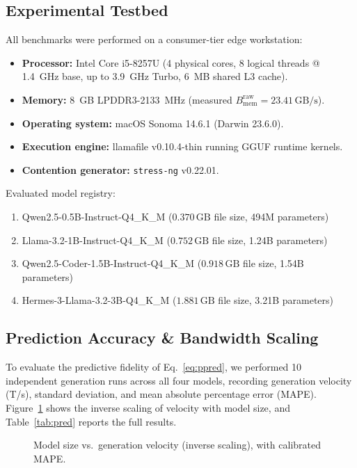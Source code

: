 \documentclass[11pt,a4paper]{article}
\newcommand{\Braw}{B_{\mathrm{mem}}^{\mathrm{raw}}}
\newcommand{\Ts}{\,\mathrm{T/s}}
\newcommand{\GBs}{\,\mathrm{GB/s}}
\newcommand{\GB}{\,\mathrm{GB}}
\newcommand{\code}[1]{\texttt{#1}}
\begin{document}
\subsection{Experimental Testbed}
All benchmarks were performed on a consumer-tier edge workstation:
\begin{itemize}[leftmargin=*]
\item \textbf{Processor:} Intel Core i5-8257U (4 physical cores, 8 logical threads @ 1.4~GHz base, up to 3.9~GHz Turbo, 6~MB shared L3 cache).
\item \textbf{Memory:} 8~GB LPDDR3-2133~MHz (measured $\Braw = 23.41\GBs$).
\item \textbf{Operating system:} macOS Sonoma 14.6.1 (Darwin 23.6.0).
\item \textbf{Execution engine:} llamafile v0.10.4-thin running GGUF runtime kernels.
\item \textbf{Contention generator:} \code{stress-ng} v0.22.01.
\end{itemize}
Evaluated model registry:
\begin{enumerate}[leftmargin=*]
\item Qwen2.5-0.5B-Instruct-Q4\_K\_M ($0.370\GB$ file size, 494M parameters)
\item Llama-3.2-1B-Instruct-Q4\_K\_M ($0.752\GB$ file size, 1.24B parameters)
\item Qwen2.5-Coder-1.5B-Instruct-Q4\_K\_M ($0.918\GB$ file size, 1.54B parameters)
\item Hermes-3-Llama-3.2-3B-Q4\_K\_M ($1.881\GB$ file size, 3.21B parameters)
\end{enumerate}

\subsection{Prediction Accuracy \& Bandwidth Scaling}
To evaluate the predictive fidelity of Eq.~\eqref{eq:ppred}, we performed 10 independent generation runs across all four models, recording generation velocity (T/s), standard deviation, and mean absolute percentage error (MAPE). Figure~\ref{fig:bars} shows the inverse scaling of velocity with model size, and Table~\ref{tab:pred} reports the full results.

\begin{figure}[h]
\centering
{}
\caption{Model size vs.\ generation velocity (inverse scaling), with calibrated MAPE.}\label{fig:bars}
\end{figure}
\end{document}
